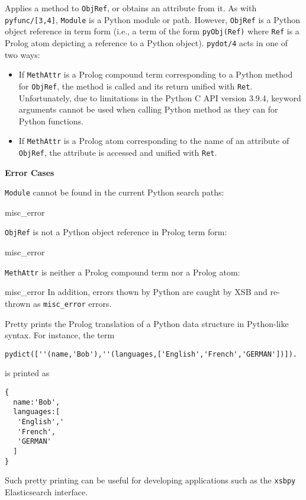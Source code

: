 \begin{description}
%
Applies a method to {\tt ObjRef}, or obtains an attribute from it.  As
with {\tt pyfunc/[3,4]}, {\tt Module} is a Python module or
path. However, {\tt ObjRef} is a Python object reference in term form
(i.e., a term of the form {\tt pyObj(Ref)} where {\tt Ref} is a Prolog
atom depicting a reference to a Python object). {\tt pydot/4} acts in
one of two ways:
\begin{itemize}
\item If {\tt MethAttr} is a Prolog compound term corresponding to a
  Python method for {\tt ObjRef}, the method is called and its return
  unified with {\tt Ret}.  Unfortunately, due to limitations in the
  Python C API version 3.9.4, keyword arguments cannot be used when
  calling Python method as they can for Python functions.
%
\item If {\tt MethAttr} is a Prolog atom corresponding to the name of
  an attribute of {\tt ObjRef}, the attribute is accessed and unified
  with {\tt Ret}.
\end{itemize}

{\bf Error Cases}
\bi
\item {\tt Module} cannot be found in the current Python search paths:
\bi
\item misc\_error
\ei
\item {\tt ObjRef} is not a Python object reference in Prolog term form:
\bi
\item misc\_error
\ei
\item {\tt MethAttr} is neither a Prolog compound term nor a Prolog atom:
\bi
\item misc\_error \ei \ei In addition, errors thown by Python are
  caught by XSB and re-thrown as {\tt misc\_error} errors.

%
Pretty prints the Prolog translation of a Python data structure in
Python-like syntax.  For instance, the term

\begin{verbatim}
pydict([''(name,'Bob'),''(languages,['English','French','GERMAN'])]).
\end{verbatim}

\noindent
is printed as 
\begin{verbatim}
{
  name:'Bob',
  languages:[
   'English','
   'French',
   'GERMAN'
  ]
} 
\end{verbatim}

Such pretty printing can be useful for developing applications such as
the {\tt xsbpy} Elasticsearch interface.


\end{description}
